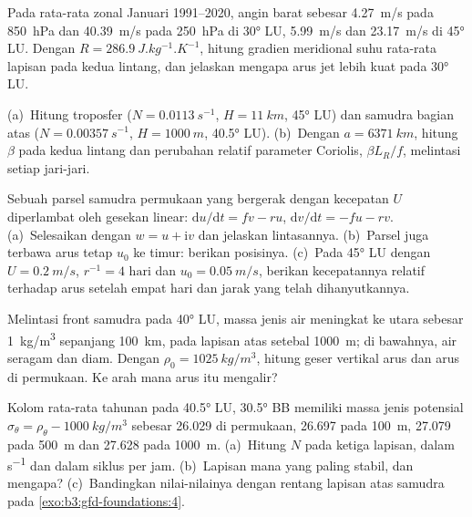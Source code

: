 \begin{exercise}[$\star\star$]\label{exo:b3:gfd-foundations:8}
Pada rata-rata zonal Januari 1991--2020, angin barat sebesar \qty{4.27}{m/s}
pada \qty{850}{hPa} dan \qty{40.39}{m/s} pada \qty{250}{hPa} di \ang{30} LU,
\qty{5.99}{m/s} dan \qty{23.17}{m/s} di \ang{45} LU. Dengan $R =
\qty{286.9}{J.kg^{-1}.K^{-1}}$, hitung gradien meridional
suhu rata-rata lapisan pada kedua lintang, dan jelaskan mengapa arus jet lebih kuat
pada \ang{30} LU.
\end{exercise}

\begin{exercise}[$\star\star$]\label{exo:b3:gfd-foundations:9}
(a)~Hitung  troposfer ($N =
\qty{0.0113}{s^{-1}}$, $H = \qty{11}{km}$, \ang{45} LU) dan
samudra bagian atas ($N = \qty{0.00357}{s^{-1}}$, $H = \qty{1000}{m}$, \ang{40.5} LU).
(b)~Dengan $a = \qty{6371}{km}$, hitung $\beta$ pada kedua lintang dan
perubahan relatif parameter Coriolis, $\beta L_R/f$, melintasi setiap jari-jari.
\end{exercise}

\begin{exercise}[$\star\star\star$]\label{exo:b3:gfd-foundations:10}
Sebuah parsel samudra permukaan yang bergerak dengan kecepatan $U$ diperlambat
oleh gesekan linear: $\mathrm du/\mathrm dt = fv - ru$, $\mathrm dv/\mathrm dt = -fu -
rv$. (a)~Selesaikan dengan $w = u + \mathrm iv$ dan jelaskan lintasannya. (b)~Parsel
juga terbawa arus tetap $u_0$ ke timur: berikan
posisinya. (c)~Pada \ang{45} LU dengan $U = \qty{0.2}{m/s}$, $r^{-1} =
\num{4}\text{ hari}$ dan $u_0 = \qty{0.05}{m/s}$, berikan kecepatannya relatif terhadap
arus setelah empat hari dan jarak yang telah dihanyutkannya.
\end{exercise}

\begin{exercise}[$\star\star\star$]\label{exo:b3:gfd-foundations:11}
Melintasi front samudra pada \ang{40} LU, massa jenis air meningkat
ke utara sebesar \qty{1}{kg/m^3} sepanjang \qty{100}{km}, pada lapisan atas
setebal \qty{1000}{m}; di bawahnya, air seragam dan diam. Dengan $\rho_0 =
\qty{1025}{kg/m^3}$, hitung geser vertikal arus dan
arus di permukaan. Ke arah mana arus itu mengalir?
\end{exercise}

\begin{exercise}[$\star\star\star$]\label{exo:b3:gfd-foundations:12}
Kolom rata-rata tahunan pada \ang{40.5} LU, \ang{30.5} BB memiliki
massa jenis potensial $\sigma_\theta = \rho_\theta - \qty{1000}{kg/m^3}$ sebesar 26.029 di
permukaan, 26.697 pada \qty{100}{m}, 27.079 pada \qty{500}{m} dan 27.628 pada
\qty{1000}{m}. (a)~Hitung $N$ pada ketiga lapisan, dalam
\unit{s^{-1}} dan dalam siklus per jam. (b)~Lapisan mana yang paling stabil,
dan mengapa? (c)~Bandingkan nilai-nilainya dengan rentang lapisan atas samudra pada
\cref{exo:b3:gfd-foundations:4}.
\end{exercise}

